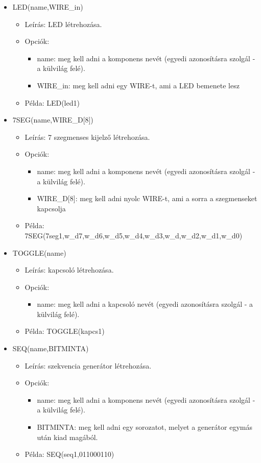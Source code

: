 \begin{itemize}
\item LED(name,WIRE\_in)
	\begin{itemize}
	\item Leírás: LED létrehozása.
	\item Opciók: 
		\begin{itemize}
			\item name: meg kell adni a komponens nevét (egyedi azonosításra szolgál - a külvilág felé).
			\item WIRE\_in: meg kell adni egy WIRE-t, ami a LED bemenete lesz
		\end{itemize}
	\item Példa: LED(led1)
	\end{itemize}

\item 7SEG(name,WIRE\_D[8])
	\begin{itemize}
	\item Leírás: 7 szegmenses kijelző létrehozása.
	\item Opciók: 
		\begin{itemize}
			\item name: meg kell adni a komponens nevét (egyedi azonosításra szolgál - a külvilág felé).
			\item WIRE\_D[8]: meg kell adni nyolc WIRE-t, ami a sorra a szegmenseket kapcsolja
		\end{itemize}
	\item Példa: 7SEG(7seg1,w\_d7,w\_d6,w\_d5,w\_d4,w\_d3,w\_d,w\_d2,w\_d1,w\_d0)
	\end{itemize}
	
\item TOGGLE(name)
	\begin{itemize}
	\item Leírás: kapcsoló létrehozása.
	\item Opciók: 
		\begin{itemize}
			\item name: meg kell adni a kapcsoló nevét (egyedi azonosításra szolgál - a külvilág felé).
		\end{itemize}
	\item Példa: TOGGLE(kapcs1)
	\end{itemize}		

\item SEQ(name,BITMINTA)
	\begin{itemize}
	\item Leírás: szekvencia generátor létrehozása.
	\item Opciók: 
		\begin{itemize}
			\item name: meg kell adni a komponens nevét (egyedi azonosításra szolgál - a külvilág felé).
			\item BITMINTA: meg kell adni egy sorozatot, melyet a generátor egymás után kiad magából.
		\end{itemize}
	\item Példa: SEQ(seq1,011000110)
	\end{itemize}


\end{itemize}
